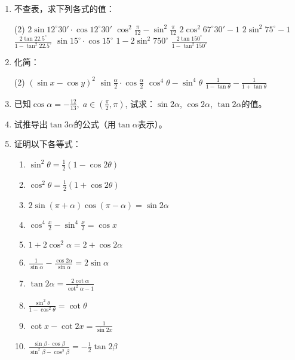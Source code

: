 \begin{ex}
\begin{enumerate}
    \item 不查表，求下列各式的值：
\begin{tasks}(2)
    \task $2\sin12^{\circ}30'\cdot \cos12^{\circ}30'$
    \task $\cos^2\frac{\pi}{12}-\sin^2\frac{\pi}{12}$
    \task $2\cos^2 67^{\circ}30'-1$
    \task $2\sin^2 75^{\circ}-1$
    \task $\frac{2\tan 22.5^{\circ}}{1-\tan^2 22.5^{\circ}}$
    \task $\sin 15^{\circ}\cdot \cos 15^{\circ}$
    \task $1-2\sin^2 750^{\circ}$
    \task $\frac{2\tan 150^{\circ}}{1-\tan^2 150^{\circ}}$
\end{tasks}
\item 化简：
\begin{tasks}(2)
    \task $(\sin x-\cos y)^2$
    \task $\sin \frac{\alpha}{2}\cdot\cos\frac{\alpha}{2}$
    \task $\cos^4\theta-\sin^4\theta$
    \task $\frac{1}{1-\tan\theta}-\frac{1}{1+\tan\theta}$
\end{tasks}

\item     已知$\cos\alpha=-\frac{12}{13},\; a\in \left(\frac{\pi}{2},\pi\right)$, 试求：$\sin2\alpha$, $\cos2\alpha$, $\tan2\alpha$的值。

\item 试推导出$\tan3\alpha$的公式（用$\tan\alpha$表示）。

\item 证明以下各等式：
\begin{enumerate}
    \item $\sin^2\theta=\frac{1}{2}(1-\cos2\theta)$
    \item $\cos^2\theta=\frac{1}{2}(1+\cos2\theta)$
    \item $2\sin(\pi+\alpha)\cos(\pi-\alpha)=\sin2\alpha$
    \item $\cos^4\frac{x}{2}-\sin^4\frac{x}{2}=\cos x$
    \item $1+2\cos^2\alpha=2+\cos2\alpha$
    \item $\frac{1}{\sin\alpha}-\frac{\cos2\alpha}{\sin\alpha}=2\sin\alpha$
    \item $\tan2\alpha=\frac{2\cot\alpha}{\cot^2\alpha-1}$
    \item $\frac{\sin^2\theta}{1-\cos^2\theta}=\cot\theta$
    \item $\cot x-\cot2x=\frac{1}{\sin 2x}$
    \item $\frac{\sin\beta\cdot \cos\beta}{\sin^2\beta-\cos^2\beta}=-\frac{1}{2}\tan2\beta$
\end{enumerate}
\end{enumerate}    


\end{ex}

